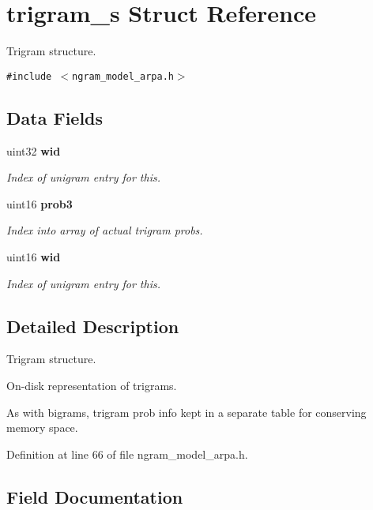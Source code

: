 \section{trigram\_\-s Struct Reference}
\label{structtrigram__s}
Trigram structure.  


{\tt \#include $<$ngram\_\-model\_\-arpa.h$>$}

\subsection*{Data Fields}
\begin{CompactItemize}
\item 
uint32 {\bf wid}
\begin{CompactList}\small\item\em Index of unigram entry for this. \item\end{CompactList}\item 
uint16 {\bf prob3}\label{structtrigram__s_52f3fad42f7c653a469af0c1b75988a9}

\begin{CompactList}\small\item\em Index into array of actual trigram probs. \item\end{CompactList}\item 
uint16 {\bf wid}
\begin{CompactList}\small\item\em Index of unigram entry for this. \item\end{CompactList}\end{CompactItemize}


\subsection{Detailed Description}
Trigram structure. 

On-disk representation of trigrams.

As with bigrams, trigram prob info kept in a separate table for conserving memory space. 

Definition at line 66 of file ngram\_\-model\_\-arpa.h.

\subsection{Field Documentation}
